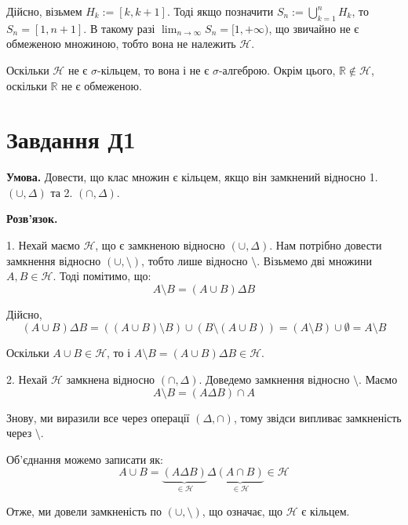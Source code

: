 \documentclass[12pt]{extarticle}
\begin{document}
Дійсно, візьмем $H_k := [k,k+1]$. Тоді якщо позначити $S_n := \bigcup_{k=1}^{n}H_k$, то $S_n = [1,n+1]$. В такому разі $\lim_{n\to\infty}S_n = [1,+\infty)$, що звичайно не є обмеженою множиною, тобто вона не належить $\mathcal{H}$. 

Оскільки $\mathcal{H}$ не є $\sigma$-кільцем, то вона і не є $\sigma$-алгеброю. Окрім цього, $\mathbb{R} \notin \mathcal{H}$, оскільки $\mathbb{R}$ не є обмеженою. 

\section*{Завдання Д1}

\textbf{Умова.} Довести, що клас множин є кільцем, якщо він замкнений відносно 1. $(\cup, \Delta)$ та 2. $(\cap, \Delta)$. 

\textbf{Розв'язок.} 

1. Нехай маємо $\mathcal{H}$, що є замкненою відносно $(\cup,\Delta)$. Нам потрібно довести замкнення відносно $(\cup,\setminus)$, тобто лише відносно $\setminus$. Візьмемо дві множини $A, B \in \mathcal{H}$. Тоді помітимо, що:
\[
A \setminus B = (A \cup B) \Delta B
\]

Дійсно,
\[
(A \cup B) \Delta B = ((A \cup B) \setminus B) \cup (B \setminus (A \cup B)) = (A \setminus B) \cup \emptyset = A \setminus B
\]

Оскільки $A \cup B \in \mathcal{H}$, то і $A\setminus B = (A \cup B) \Delta B \in \mathcal{H}$.

2. Нехай $\mathcal{H}$ замкнена відносно $(\cap, \Delta)$. Доведемо замкнення відносно $\setminus$. Маємо
\[
A \setminus B = (A \Delta B) \cap A
\]

Знову, ми виразили все через операції $(\Delta,\cap)$, тому звідси випливає замкненість через $\setminus$. 

Об'єднання можемо записати як:
\[
A \cup B = \underbrace{(A \Delta B)}_{\in \mathcal{H}} \Delta \underbrace{(A \cap B)}_{\in \mathcal{H}} \in \mathcal{H}
\]

Отже, ми довели замкненість по $(\cup, \setminus)$, що означає, що $\mathcal{H}$ є кільцем.
\end{document}
